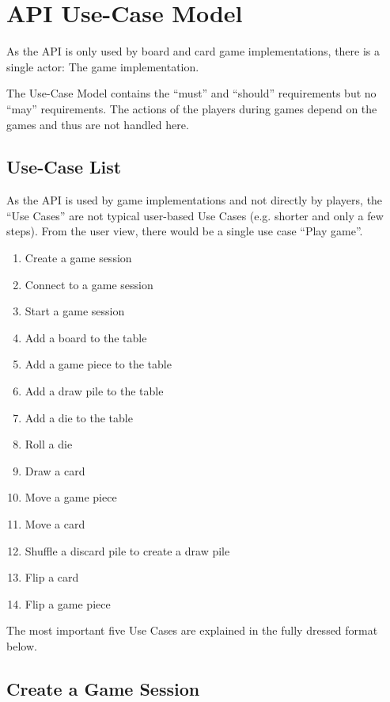 \section{API Use-Case Model}

As the API is only used by board and card game implementations, there is a
single actor: The game implementation.

The Use-Case Model contains the ``must'' and ``should'' requirements but no ``may''
requirements. The actions of the players during games depend on the games and
thus are not handled here.

\subsection{Use-Case List}

As the API is used by game implementations and not directly by players, the
``Use Cases'' are not typical user-based Use Cases (e.g. shorter and only a
few steps). From the user view, there would be a single use case ``Play game''.

\begin{enumerate}
  \item Create a game session
  \item Connect to a game session
  \item Start a game session
  \item Add a board to the table
  \item Add a game piece to the table
  \item Add a \gls{draw pile} to the table
  \item Add a \gls{die} to the table
  \item Roll a \gls{die}
  \item Draw a card
  \item Move a game piece
  \item Move a card
  \item Shuffle a \gls{discard pile} to create a \gls{draw pile}
  \item Flip a card
  \item Flip a game piece
\end{enumerate}

The most important five Use Cases are explained in the fully dressed format
below.

\subsection{Create a Game Session}


